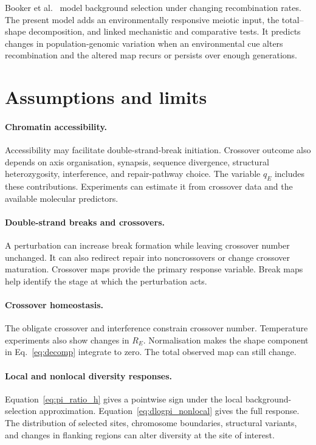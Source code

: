 \documentclass[11pt]{article}
\theoremstyle{remark}
\begin{document}
Booker et al.\ \citep{booker2022} model background selection under changing
recombination rates. The present model adds an environmentally responsive meiotic
input, the total--shape decomposition, and linked mechanistic and comparative
tests. It predicts changes in population-genomic variation when an environmental
cue alters recombination and the altered map recurs or persists over enough
generations.

\section{Assumptions and limits}
\label{sec:limits}

\paragraph{Chromatin accessibility.}
Accessibility may facilitate double-strand-break initiation. Crossover outcome
also depends on axis organisation, synapsis, sequence divergence, structural
heterozygosity, interference, and repair-pathway choice. The variable $q_E$ includes these contributions. Experiments can estimate it from
crossover data and the available molecular predictors.

\paragraph{Double-strand breaks and crossovers.}
A perturbation can increase break formation while leaving crossover number
unchanged. It can also redirect repair into noncrossovers or change crossover
maturation. Crossover maps provide the primary response variable. Break maps help
identify the stage at which the perturbation acts.

\paragraph{Crossover homeostasis.}
The obligate crossover and interference constrain crossover number. Temperature
experiments also show changes in $R_E$. Normalisation makes the shape component in
Eq.~\eqref{eq:decomp} integrate to zero. The total observed map can still change.

\paragraph{Local and nonlocal diversity responses.}
Equation~\eqref{eq:pi_ratio_h} gives a pointwise sign under the local
background-selection approximation. Equation~\eqref{eq:dlogpi_nonlocal} gives the full response. The distribution of
selected sites, chromosome boundaries, structural variants, and changes in
flanking regions can alter diversity at the site of interest.
\end{document}
